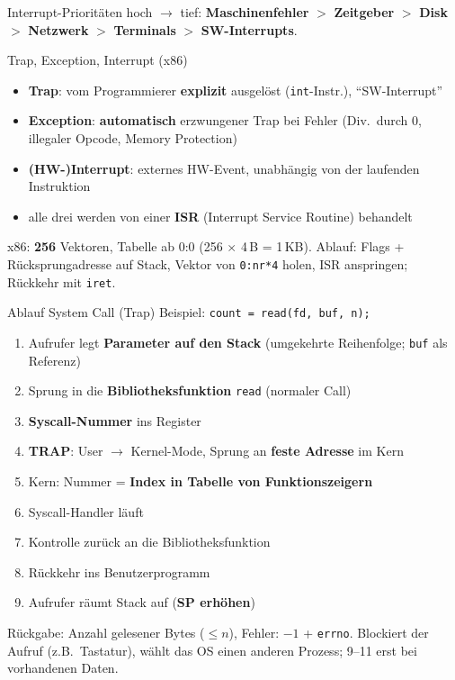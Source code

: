 \documentclass[a4paper, fontsize=7pt]{scrartcl}
\begin{document}
\begin{mainbox}{Interrupt-Prioritäten}
hoch $\to$ tief: \textbf{Maschinenfehler} $>$ \textbf{Zeitgeber} $>$
\textbf{Disk} $>$ \textbf{Netzwerk} $>$ \textbf{Terminals} $>$
\textbf{SW-Interrupts}.
\end{mainbox}

\begin{subbox}{Trap, Exception, Interrupt (x86)}
\begin{itemize}
    \item \textbf{Trap}: vom Programmierer \textbf{explizit} ausgelöst
          (\texttt{int}-Instr.), ``SW-Interrupt''
    \item \textbf{Exception}: \textbf{automatisch} erzwungener Trap bei
          Fehler (Div.\ durch 0, illegaler Opcode, Memory Protection)
    \item \textbf{(HW-)Interrupt}: externes HW-Event, unabhängig von der
          laufenden Instruktion
    \item alle drei werden von einer \textbf{ISR} (Interrupt Service
          Routine) behandelt
\end{itemize}
x86: \textbf{256} Vektoren, Tabelle ab 0:0 (256 $\times$ 4\,B = 1\,KB).
Ablauf: Flags + Rücksprungadresse auf Stack, Vektor von
\texttt{0:nr*4} holen, ISR anspringen; Rückkehr mit \texttt{iret}.
\end{subbox}

\begin{mainbox}{Ablauf System Call (Trap)}
Beispiel: \texttt{count = read(fd, buf, n);}
\begin{enumerate}
    \item[1--3.] Aufrufer legt \textbf{Parameter auf den Stack}
          (umgekehrte Reihenfolge; \texttt{buf} als Referenz)
    \item[4.] Sprung in die \textbf{Bibliotheksfunktion} \texttt{read}
          (normaler Call)
    \item[5.] \textbf{Syscall-Nummer} ins Register
    \item[6.] \textbf{TRAP}: User $\to$ Kernel-Mode, Sprung an
          \textbf{feste Adresse} im Kern
    \item[7.] Kern: Nummer = \textbf{Index in Tabelle von
          Funktionszeigern}
    \item[8.] Syscall-Handler läuft
    \item[9.] Kontrolle zurück an die Bibliotheksfunktion
    \item[10.] Rückkehr ins Benutzerprogramm
    \item[11.] Aufrufer räumt Stack auf (\textbf{SP erhöhen})
\end{enumerate}
Rückgabe: Anzahl gelesener Bytes ($\le n$), Fehler: $-1$ + \texttt{errno}.
Blockiert der Aufruf (z.B.\ Tastatur), wählt das OS einen anderen Prozess;
9--11 erst bei vorhandenen Daten.
\end{mainbox}
\end{document}
